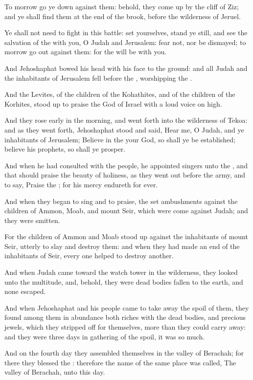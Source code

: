 \Verse To morrow go ye down against them: behold, they come up by the cliff of Ziz; and ye shall find them at the end of the brook, before the wilderness of Jeruel.

\Verse Ye shall not need to fight in this battle: set yourselves, stand ye still, and see the salvation of the \LORD with you, O Judah and Jerusalem: fear not, nor be dismayed; to morrow go out against them: for the \LORD will be with you.

\Verse And Jehoshaphat bowed his head with his face to the ground: and all Judah and the inhabitants of Jerusalem fell before the \LORD, worshipping the \LORD.

\Verse And the Levites, of the children of the Kohathites, and of the children of the Korhites, stood up to praise the \LORD God of Israel with a loud voice on high.

\Verse And they rose early in the morning, and went forth into the wilderness of Tekoa: and as they went forth, Jehoshaphat stood and said, Hear me, O Judah, and ye inhabitants of Jerusalem; Believe in the \LORD your God, so shall ye be established; believe his prophets, so shall ye prosper.

\Verse And when he had consulted with the people, he appointed singers unto the \LORD, and that should praise the beauty of holiness, as they went out before the army, and to say, Praise the \LORD; for his mercy endureth for ever.

\Verse And when they began to sing and to praise, the \LORD set ambushments against the children of Ammon, Moab, and mount Seir, which were come against Judah; and they were smitten.

\Verse For the children of Ammon and Moab stood up against the inhabitants of mount Seir, utterly to slay and destroy them: and when they had made an end of the inhabitants of Seir, every one helped to destroy another.

\Verse And when Judah came toward the watch tower in the wilderness, they looked unto the multitude, and, behold, they were dead bodies fallen to the earth, and none escaped.

\Verse And when Jehoshaphat and his people came to take away the spoil of them, they found among them in abundance both riches with the dead bodies, and precious jewels, which they stripped off for themselves, more than they could carry away: and they were three days in gathering of the spoil, it was so much.

\Verse And on the fourth day they assembled themselves in the valley of Berachah; for there they blessed the \LORD: therefore the name of the same place was called, The valley of Berachah, unto this day.

